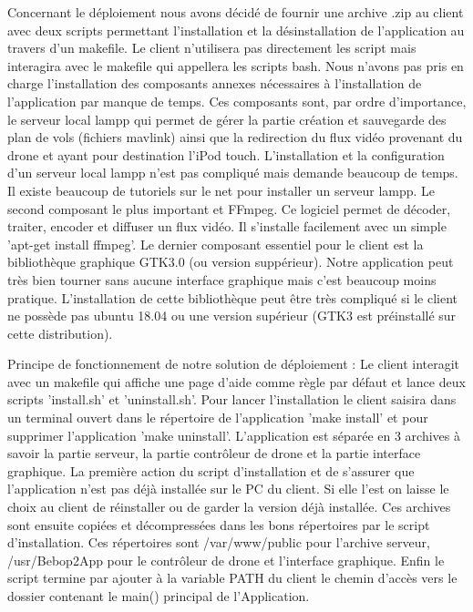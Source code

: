 \documentclass{article}
\begin{document}
Concernant le déploiement nous avons décidé de fournir une archive .zip au client avec deux scripts permettant l'installation et la désinstallation de l'application au travers d'un makefile. Le client n'utilisera pas directement les script mais interagira avec le makefile qui appellera les scripts bash. Nous n'avons pas pris en charge l'installation des composants annexes nécessaires à l'installation de l'application par manque de temps. Ces composants sont, par ordre d'importance, le serveur local lampp qui permet de gérer la partie création et sauvegarde des plan de vols (fichiers mavlink) ainsi que la redirection du flux vidéo provenant du drone et ayant pour destination l'iPod touch. L'installation et la configuration d'un serveur local lampp n'est pas compliqué mais demande beaucoup de temps. Il existe beaucoup de tutoriels sur le net pour installer un serveur lampp. Le second composant le plus important et FFmpeg. Ce logiciel permet de décoder, traiter, encoder et diffuser un flux vidéo. Il s'installe facilement avec un simple 'apt-get install ffmpeg'. Le dernier composant essentiel pour le client est la bibliothèque graphique GTK3.0 (ou version suppérieur). Notre application peut très bien tourner sans aucune interface graphique mais c'est beaucoup moins pratique. L'installation de cette bibliothèque peut être très compliqué si le client ne possède pas ubuntu 18.04 ou une version supérieur (GTK3 est préinstallé sur cette distribution).

Principe de fonctionnement de notre solution de déploiement :
Le client interagit avec un makefile qui affiche une page d'aide comme règle par défaut et lance deux scripts 'install.sh' et 'uninstall.sh'. Pour lancer l'installation le client saisira dans un terminal ouvert dans le répertoire de l'application 'make install' et pour supprimer l'application 'make uninstall'.
L'application est séparée en 3 archives à savoir la partie serveur, la partie contrôleur de drone et la partie interface graphique. La première action du script d'installation et de s'assurer que l'application n'est pas déjà installée sur le PC du client. Si elle l'est on laisse le choix au client de réinstaller ou de garder la version déjà installée.
Ces archives sont ensuite copiées et décompressées dans les bons répertoires par le script d'installation. Ces répertoires sont /var/www/public pour l'archive serveur, /usr/Bebop2App pour le contrôleur de drone et l'interface graphique.
Enfin le script termine par ajouter à la variable PATH du client le chemin d'accès vers le dossier contenant le main() principal de l'Application.
\end{document}
